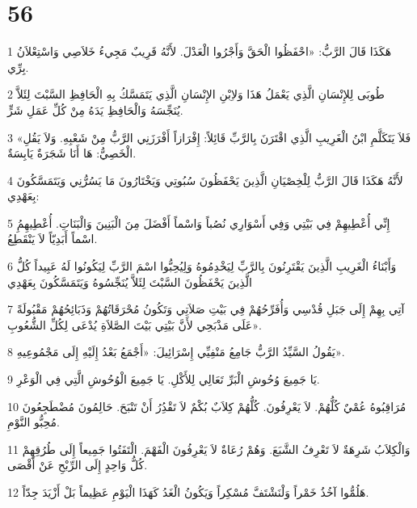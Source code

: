 \chapter{56}

\par 1 هَكَذَا قَالَ الرَّبُّ: «احْفَظُوا الْحَقَّ وَأَجْرُوا الْعَدْلَ. لأَنَّهُ قَرِيبٌ مَجِيءُ خَلاَصِي وَاسْتِعْلاَنُ بِرِّي.
\par 2 طُوبَى لِلإِنْسَانِ الَّذِي يَعْمَلُ هَذَا وَلاِبْنِ الإِنْسَانِ الَّذِي يَتَمَسَّكُ بِهِ الْحَافِظِ السَّبْتَ لِئَلاَّ يُنَجِّسَهُ وَالْحَافِظِ يَدَهُ مِنْ كُلِّ عَمَلِ شَرٍّ.
\par 3 «فَلاَ يَتَكَلَّمِ ابْنُ الْغَرِيبِ الَّذِي اقْتَرَنَ بِالرَّبِّ قَائِلاً: إِفْرَازاً أَفْرَزَنِي الرَّبُّ مِنْ شَعْبِهِ. وَلاَ يَقُلِ الْخَصِيُّ: هَا أَنَا شَجَرَةٌ يَابِسَةٌ.
\par 4 لأَنَّهُ هَكَذَا قَالَ الرَّبُّ لِلْخِصْيَانِ الَّذِينَ يَحْفَظُونَ سُبُوتِي وَيَخْتَارُونَ مَا يَسُرُّنِي وَيَتَمَسَّكُونَ بِعَهْدِي:
\par 5 إِنِّي أُعْطِيهِمْ فِي بَيْتِي وَفِي أَسْوَارِي نُصُباً وَاسْماً أَفْضَلَ مِنَ الْبَنِينَ وَالْبَنَاتِ. أُعْطِيهِمُِ اسْماً أَبَدِيّاً لاَ يَنْقَطِعُ.
\par 6 وَأَبْنَاءُ الْغَرِيبِ الَّذِينَ يَقْتَرِنُونَ بِالرَّبِّ لِيَخْدِمُوهُ وَلِيُحِبُّوا اسْمَ الرَّبِّ لِيَكُونُوا لَهُ عَبِيداً كُلُّ الَّذِينَ يَحْفَظُونَ السَّبْتَ لِئَلاَّ يُنَجِّسُوهُ وَيَتَمَسَّكُونَ بِعَهْدِي
\par 7 آتِي بِهِمْ إِلَى جَبَلِ قُدْسِي وَأُفَرِّحُهُمْ فِي بَيْتِ صَلاَتِي وَتَكُونُ مُحْرَقَاتُهُمْ وَذَبَائِحُهُمْ مَقْبُولَةً عَلَى مَذْبَحِي لأَنَّ بَيْتِي بَيْتَ الصَّلاَةِ يُدْعَى لِكُلِّ الشُّعُوبِ».
\par 8 يَقُولُ السَّيِّدُ الرَّبُّ جَامِعُ مَنْفِيِّي إِسْرَائِيلَ: «أَجْمَعُ بَعْدُ إِلَيْهِ إِلَى مَجْمُوعِيهِ».
\par 9 يَا جَمِيعَ وُحُوشِ الْبَرِّ تَعَالِي لِلأَكْلِ. يَا جَمِيعَ الْوُحُوشِ الَّتِي فِي الْوَعْرِ.
\par 10 مُرَاقِبُوهُ عُمْيٌ كُلُّهُمْ. لاَ يَعْرِفُونَ. كُلُّهُمْ كِلاَبٌ بُكْمٌ لاَ تَقْدُِرُ أَنْ تَنْبَحَ. حَالِمُونَ مُضْطَجِعُونَ مُحِبُّو النَّوْمِ.
\par 11 وَالْكِلاَبُ شَرِهَةٌ لاَ تَعْرِفُ الشَّبَعَ. وَهُمْ رُعَاةٌ لاَ يَعْرِفُونَ الْفَهْمَ. الْتَفَتُوا جَمِيعاً إِلَى طُرُقِهِمْ كُلُّ وَاحِدٍ إِلَى الرِّبْحِ عَنْ أَقْصَى.
\par 12 هَلُمُّوا آخُذُ خَمْراً وَلْنَشْتَفَّ مُسْكِراً وَيَكُونُ الْغَدُ كَهَذَا الْيَوْمِ عَظِيماً بَلْ أَزْيَدَ جِدّاً.

